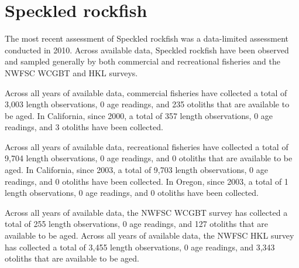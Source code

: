 \documentclass[11pt,
  english,
  letterpaper,
]{article}
\begin{document}

\hypertarget{speckled-rockfish}{%
\section{Speckled rockfish}\label{speckled-rockfish}}

\leavevmode\tagmcend\tagstructend


The most recent assessment of Speckled rockfish was a data-limited assessment conducted in 2010. Across available data, Speckled rockfish have been observed and sampled generally by both commercial and recreational fisheries and the NWFSC WCGBT and HKL surveys.

\leavevmode\tagmcend\tagstructend\par


Across all years of available data, commercial fisheries have collected a total of 3,003 length observations, 0 age readings, and 235 otoliths that are available to be aged. In California, since 2000, a total of 357 length observations, 0 age readings, and 3 otoliths have been collected.

\leavevmode\tagmcend\tagstructend\par


Across all years of available data, recreational fisheries have collected a total of 9,704 length observations, 0 age readings, and 0 otoliths that are available to be aged. In California, since 2003, a total of 9,703 length observations, 0 age readings, and 0 otoliths have been collected. In Oregon, since 2003, a total of 1 length observations, 0 age readings, and 0 otoliths have been collected.

\leavevmode\tagmcend\tagstructend\par


Across all years of available data, the NWFSC WCGBT survey has collected a total of 255 length observations, 0 age readings, and 127 otoliths that are available to be aged. Across all years of available data, the NWFSC HKL survey has collected a total of 3,455 length observations, 0 age readings, and 3,343 otoliths that are available to be aged.

\leavevmode\tagmcend\tagstructend\par
\end{document}
